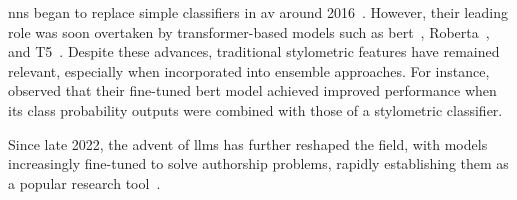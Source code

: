\acp{nn} began to replace simple classifiers in \ac{av} around 2016~\citep{schmidt_llm_av_latin_24}. 
However, their leading role was soon overtaken by transformer-based models such as \acs{bert}~\citep{bert_2019}, Ro\acs{bert}a~\citep{roberta_2019}, and T5~\citep{t5_2020}. 
Despite these advances, traditional stylometric features have remained relevant, especially when incorporated into ensemble approaches. 
For instance, \citet{bertaa_2020} observed that their fine-tuned \acs{bert} model achieved improved performance when its class probability outputs were combined with those of a stylometric classifier.

Since late 2022, the advent of \acp{llm} has further reshaped the field, with models increasingly fine-tuned to solve authorship problems, rapidly establishing them as a popular research tool~\citep{schmidt_llm_av_latin_24}.
